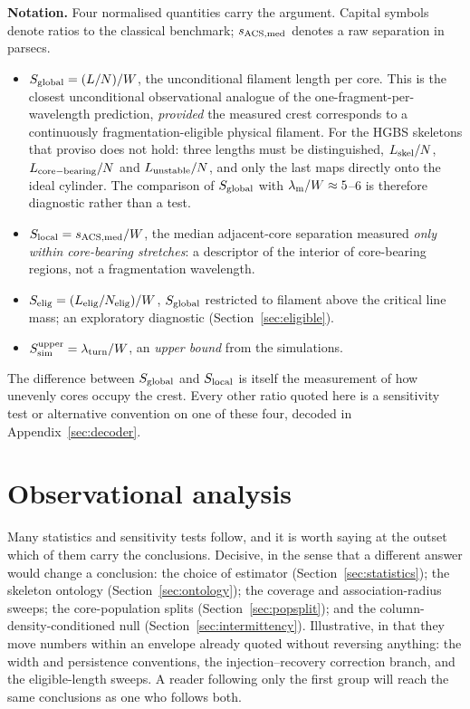\documentclass[usenatbib,twoside,twocolumn]{mnras}
\begin{document}
\label{sec:intro_notation}
\noindent\textbf{Notation.} Four normalised quantities carry the argument. Capital symbols denote ratios to the classical benchmark; $s_{\rm ACS,med}$ denotes a raw separation in parsecs.
\begin{itemize}\setlength{\itemsep}{1pt}
\item $S_{\rm global}=(L/N)/W$, the unconditional filament length per core. This is the closest unconditional observational analogue of the one-fragment-per-wavelength prediction, \emph{provided} the measured crest corresponds to a continuously fragmentation-eligible physical filament. For the HGBS skeletons that proviso does not hold: three lengths must be distinguished, $L_{\rm skel}/N$, $L_{\rm core-bearing}/N$ and $L_{\rm unstable}/N$, and only the last maps directly onto the ideal cylinder. The comparison of $S_{\rm global}$ with $\lambda_{\rm m}/W\approx5$--$6$ is therefore diagnostic rather than a test.
\item $S_{\rm local}=s_{\rm ACS,med}/W$, the median adjacent-core separation measured \emph{only within core-bearing stretches}: a descriptor of the interior of core-bearing regions, not a fragmentation wavelength.
\item $S_{\rm elig}=(L_{\rm elig}/N_{\rm elig})/W$, $S_{\rm global}$ restricted to filament above the critical line mass; an exploratory diagnostic (Section~\ref{sec:eligible}).
\item $S_{\rm sim}^{\rm upper}=\lambda_{\rm turn}/W$, an \emph{upper bound} from the simulations.
\end{itemize}
The difference between $S_{\rm global}$ and $S_{\rm local}$ is itself the measurement of how unevenly cores occupy the crest. Every other ratio quoted here is a sensitivity test or alternative convention on one of these four, decoded in Appendix~\ref{sec:decoder}.

\section{Observational analysis}

\noindent Many statistics and sensitivity tests follow, and it is worth saying at the outset which of them carry the conclusions. Decisive, in the sense that a different answer would change a conclusion: the choice of estimator (Section~\ref{sec:statistics}); the skeleton ontology (Section~\ref{sec:ontology}); the coverage and association-radius sweeps; the core-population splits (Section~\ref{sec:popsplit}); and the column-density-conditioned null (Section~\ref{sec:intermittency}). Illustrative, in that they move numbers within an envelope already quoted without reversing anything: the width and persistence conventions, the injection--recovery correction branch, and the eligible-length sweeps. A reader following only the first group will reach the same conclusions as one who follows both.
\end{document}
